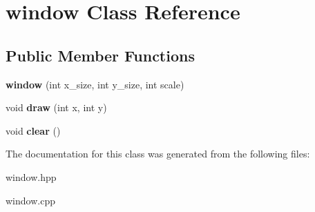 \hypertarget{classwindow}{}\section{window Class Reference}
\label{classwindow}
\subsection*{Public Member Functions}
\begin{DoxyCompactItemize}
\item 
{\bfseries window} (int x\+\_\+size, int y\+\_\+size, int scale)\hypertarget{classwindow_a26b54741901955b42941d3e08f09ba83}{}\label{classwindow_a26b54741901955b42941d3e08f09ba83}

\item 
void {\bfseries draw} (int x, int y)\hypertarget{classwindow_a20541f9e1801404baf9a9184365e9b93}{}\label{classwindow_a20541f9e1801404baf9a9184365e9b93}

\item 
void {\bfseries clear} ()\hypertarget{classwindow_a6c050475db28a9b773cf2edbc56ece86}{}\label{classwindow_a6c050475db28a9b773cf2edbc56ece86}

\end{DoxyCompactItemize}


The documentation for this class was generated from the following files\+:\begin{DoxyCompactItemize}
\item 
window.\+hpp\item 
window.\+cpp\end{DoxyCompactItemize}
